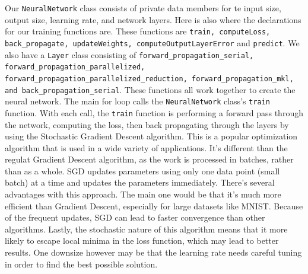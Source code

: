 \documentclass[12pt, twocolumn]{report}
\begin{document}
Our \texttt{NeuralNetwork} class consists of private data members for te input size, output size, learning rate, and network layers. Here is also where the declarations
for our training functions are. These functions are \texttt{train, computeLoss, back\_propagate, updateWeights, computeOutputLayerError} and \texttt{predict}. We also have a \texttt{Layer} class
consisting of \texttt{forward\_propagation\_serial, forward\_propagation\_parallelized, forward\_propagation\_parallelized\_reduction, forward\_propagation\_mkl, \textnormal{and} back\_propagation\_serial}.
These functions all work together to create the neural network. The main for loop calls the \texttt{NeuralNetwork} class's \texttt{train} function.
With each call, the \texttt{train} function is performing a forward pass through the network, computing the loss, then back propagating through the layers
by using the Stochastic Gradient Descent algorithm. This is a popular optimization algorithm that is used in a wide variety of applications.
It's different than the regulat Gradient Descent algorithm, as the work is processed in batches, rather than as a whole. SGD updates parameters
using only one data point (small batch) at a time and updates the parameters immediately. There's several advantages with this approach. The main one would be
that it's much more efficient than Gradient Descent, especially for large datasets like MNIST. Because of the frequent updates, SGD can lead to faster
convergence than other algorithms. Lastly, the stochastic nature of this algorithm means that it more likely to escape local minima in the loss function,
which may lead to better results. One downsize however may be that the learning rate needs careful tuning in order to find the best possible solution.
\\
\end{document}
